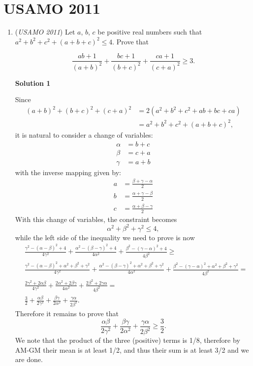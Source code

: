 \section{USAMO 2011}
        \begin{enumerate}
        	\item (\textit{USAMO 2011}) Let $a$, $b$, $c$ be positive real numbers such that $a^2 + b^2 + c^2 + (a + b + c)^2 \le 4$.  Prove that

 \[\frac{ab + 1}{(a + b)^2} + \frac{bc + 1}{(b + c)^2} + \frac{ca + 1}{(c + a)^2} \ge 3.\]




\textbf{Solution 1}

Since
 \begin{align*} (a+b)^2 + (b+c)^2 + (c+a)^2 &= 2(a^2 + b^2 + c^2 + ab + bc + ca) \\ 	&= a^2 + b^2 + c^2 + (a + b + c)^2, \end{align*}
it is natural to consider a change of variables:
 \begin{align*} \alpha &= b + c \\ \beta &= c + a \\ \gamma &= a + b \end{align*}
with the inverse mapping given by:
 \begin{align*} a &= \frac{\beta + \gamma - \alpha}2 \\ b &= \frac{\alpha + \gamma - \beta}2 \\ c &= \frac{\alpha + \beta - \gamma}2 \end{align*}
With this change of variables, the constraint becomes
 \[\alpha^2 + \beta^2 + \gamma^2 \le 4,\]while the left side of the inequality we need to prove is now
 \begin{align*} & \frac{\gamma^2 - (\alpha - \beta)^2 + 4}{4\gamma^2} + \frac{\alpha^2 - (\beta - \gamma)^2 + 4}{4\alpha^2} + \frac{\beta^2 - (\gamma - \alpha)^2 + 4}{4\beta^2} \ge \\ & \frac{\gamma^2 - (\alpha - \beta)^2 + \alpha^2 + \beta^2 + \gamma^2}{4\gamma^2} + \frac{\alpha^2 - (\beta - \gamma)^2 + \alpha^2 + \beta^2 + \gamma^2}{4\alpha^2} + \frac{\beta^2 - (\gamma - \alpha)^2 + \alpha^2 + \beta^2 + \gamma^2}{4\beta^2} = \\ & \frac{2\gamma^2 + 2\alpha\beta}{4\gamma^2} + \frac{2\alpha^2 + 2\beta\gamma}{4\alpha^2} + \frac{2\beta^2 + 2\gamma\alpha}{4\beta^2} = \\ & \frac32 + \frac{\alpha\beta}{2\gamma^2} + \frac{\beta\gamma}{2\alpha^2} + \frac{\gamma\alpha}{2\beta^2}. \end{align*}
Therefore it remains to prove that
 \[\frac{\alpha\beta}{2\gamma^2} + \frac{\beta\gamma}{2\alpha^2} + \frac{\gamma\alpha}{2\beta^2} \ge \frac32.\]We note that the product of the three (positive) terms is 1/8, therefore by AM-GM their mean is at least 1/2, and thus their sum is at least 3/2 and we are done.


\end{enumerate}
